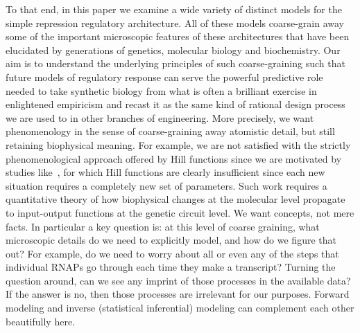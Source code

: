 To that end, in this paper we examine a wide variety of distinct models
for the simple repression regulatory architecture.  All of these
models coarse-grain away some of the important microscopic
features of these architectures that have been elucidated
by generations of genetics, molecular biology and biochemistry.  
Our aim is to understand the underlying principles of such
coarse-graining such that future models of regulatory response
can serve the powerful predictive role needed to take synthetic
biology from what is often a brilliant exercise in enlightened 
empiricism and recast it as the same kind of rational design process
we are used to in other branches of engineering.  
More precisely, we want phenomenology in the sense of
coarse-graining away atomistic detail, but still retaining biophysical meaning.
For example, we are not satisfied with the strictly phenomenological
approach offered by 
 Hill functions since we are motivated by studies like~\cite{Razo-Mejia2020}, for which Hill functions are
clearly insufficient since each new situation
requires a completely new set of parameters. Such work requires a quantitative theory of how biophysical
changes at the molecular level propagate to input-output functions at the
genetic circuit level. We want concepts, not mere facts. In particular a key
question is: at this level of coarse graining, what microscopic details do we
need to explicitly model, and how do we figure that out? For example, do we need
to worry about all or even any of the steps that individual RNAPs go through
each time they make a transcript? Turning the question around, can we see any
imprint of those processes in the available data? If the answer is no, then
those processes are irrelevant for our purposes. Forward modeling and inverse
(statistical inferential) modeling can complement each other beautifully here.

